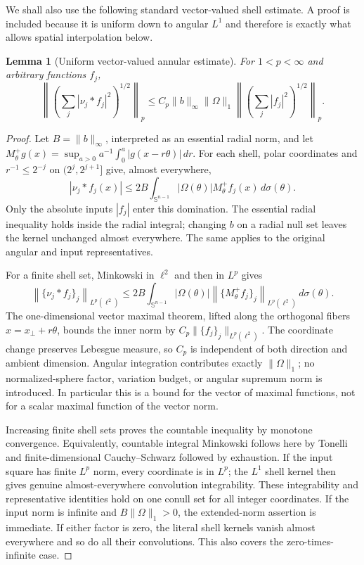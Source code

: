 \documentclass[11pt]{article}
\numberwithin{equation}{section}
\newtheorem{lemma}[theorem]{Lemma}
\theoremstyle{remark}
\theoremstyle{definition}
\newcommand{\Sph}{\mathbb S}
\begin{document}
We shall also use the following standard vector-valued shell estimate.  A
proof is included because it is uniform down to angular $L^1$ and therefore
is exactly what allows spatial interpolation below.

\begin{lemma}[Uniform vector-valued annular estimate]
\label{lem:allq-vector-shell}
For $1<p<\infty$ and arbitrary functions $f_j$,
\begin{equation}\label{eq:allq-vector-shell}
 \left\|\left(\sum_j|\nu_j*f_j|^2\right)^{1/2}\right\|_p
 \le C_p\|b\|_\infty\|\Omega\|_1
 \left\|\left(\sum_j|f_j|^2\right)^{1/2}\right\|_p.
\end{equation}
\end{lemma}

\begin{proof}
Let $B=\|b\|_\infty$, interpreted as an essential radial norm, and let
$M_\theta^+g(x)=\sup_{a>0}a^{-1}\int_0^a|g(x-r\theta)|\,dr$.
For each shell, polar coordinates and $r^{-1}\le2^{-j}$ on
$(2^j,2^{j+1}]$ give, almost everywhere,
\[
 |\nu_j*f_j(x)|
 \le 2B\int_{\Sph^{n-1}}|\Omega(\theta)|
             M_\theta^+f_j(x)\,d\sigma(\theta).
\]
Only the absolute inputs $|f_j|$ enter this domination.  The essential
radial inequality holds inside the radial integral; changing $b$ on
a radial null set leaves the kernel unchanged almost everywhere.
The same applies to the original angular and input representatives.

For a finite shell set, Minkowski in $\ell^2$ and then in $L^p$ gives
\[
 \left\|\{\nu_j*f_j\}_j\right\|_{L^p(\ell^2)}
 \le2B\int_{\Sph^{n-1}}|\Omega(\theta)|
        \left\|\{M_\theta^+f_j\}_j\right\|_{L^p(\ell^2)}
        \,d\sigma(\theta).
\]
The one-dimensional vector maximal theorem, lifted along the orthogonal
fibers $x=x_\perp+r\theta$, bounds the inner norm by
$C_p\|\{f_j\}_j\|_{L^p(\ell^2)}$.  The coordinate change preserves
Lebesgue measure, so $C_p$ is independent of both direction and ambient
dimension.  Angular integration contributes exactly $\|\Omega\|_1$;
no normalized-sphere factor, variation budget, or angular supremum norm
is introduced.  In particular this is a bound for the vector of
maximal functions, not for a scalar maximal function of the vector norm.

Increasing finite shell sets proves the countable inequality by
monotone convergence.  Equivalently, countable integral Minkowski
follows here by Tonelli and finite-dimensional Cauchy--Schwarz followed
by exhaustion.  If the input square has finite $L^p$ norm, every
coordinate is in $L^p$; the $L^1$ shell kernel then gives genuine
almost-everywhere convolution integrability.  These integrability and
representative identities hold on one conull set for all integer
coordinates.  If the input norm is infinite and $B\|\Omega\|_1>0$,
the extended-norm assertion is immediate.  If either factor is zero,
the literal shell kernels vanish almost everywhere and so do all their
convolutions.  This also covers the zero-times-infinite case.
\end{proof}
\end{document}

